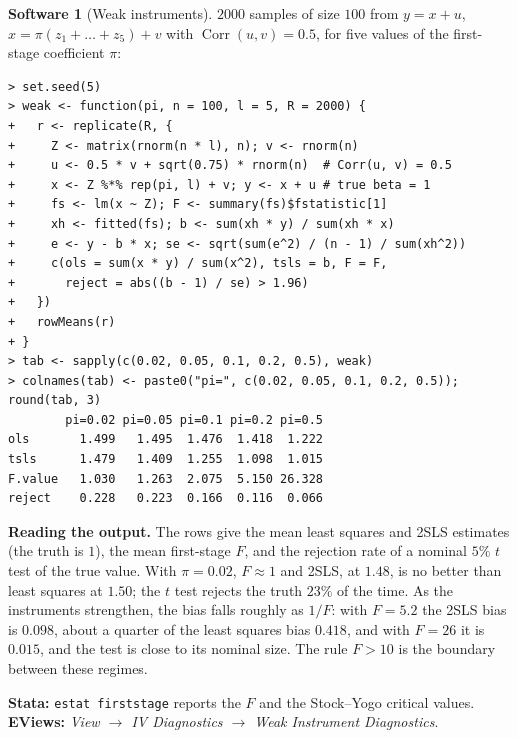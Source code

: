 \documentclass[11pt,a4paper]{article}
\numberwithin{equation}{section}
\DeclareMathOperator{\Corr}{Corr}
\theoremstyle{definition}
\newtheorem{software}[thm]{Software}
\begin{document}
\begin{software}[Weak instruments]
\label{sw:weakiv}
$2000$ samples of size $100$ from $y = x + u$, $x = \pi(z_1 + \dots + z_5) + v$ with $\Corr(u, v) = 0.5$, for five values of the first-stage coefficient $\pi$:
{\small\begin{verbatim}
> set.seed(5)
> weak <- function(pi, n = 100, l = 5, R = 2000) {
+   r <- replicate(R, {
+     Z <- matrix(rnorm(n * l), n); v <- rnorm(n)
+     u <- 0.5 * v + sqrt(0.75) * rnorm(n)  # Corr(u, v) = 0.5
+     x <- Z %*% rep(pi, l) + v; y <- x + u # true beta = 1
+     fs <- lm(x ~ Z); F <- summary(fs)$fstatistic[1]
+     xh <- fitted(fs); b <- sum(xh * y) / sum(xh * x)
+     e <- y - b * x; se <- sqrt(sum(e^2) / (n - 1) / sum(xh^2))
+     c(ols = sum(x * y) / sum(x^2), tsls = b, F = F,
+       reject = abs((b - 1) / se) > 1.96)
+   })
+   rowMeans(r)
+ }
> tab <- sapply(c(0.02, 0.05, 0.1, 0.2, 0.5), weak)
> colnames(tab) <- paste0("pi=", c(0.02, 0.05, 0.1, 0.2, 0.5)); round(tab, 3)
        pi=0.02 pi=0.05 pi=0.1 pi=0.2 pi=0.5
ols       1.499   1.495  1.476  1.418  1.222
tsls      1.479   1.409  1.255  1.098  1.015
F.value   1.030   1.263  2.075  5.150 26.328
reject    0.228   0.223  0.166  0.116  0.066
\end{verbatim}}
\textbf{Reading the output.} The rows give the mean least squares and 2SLS estimates (the truth is $1$), the mean first-stage $F$, and the rejection rate of
a nominal $5\%$ $t$ test of the true value. With $\pi = 0.02$, $F \approx 1$ and 2SLS, at $1.48$, is no better than least squares at $1.50$; the $t$ test rejects the truth $23\%$ of
the time. As the instruments strengthen, the bias falls roughly as $1/F$: with $F = 5.2$ the 2SLS bias is $0.098$, about a quarter of the least squares bias $0.418$,
and with $F = 26$ it is $0.015$, and the test is close to its nominal size. The rule $F > 10$ is the boundary between these regimes.

\textbf{Stata:} \texttt{estat firststage} reports the $F$ and the Stock--Yogo critical values. \textbf{EViews:} \emph{View $\to$ IV Diagnostics $\to$ Weak
Instrument Diagnostics}.
\end{software}
\end{document}
